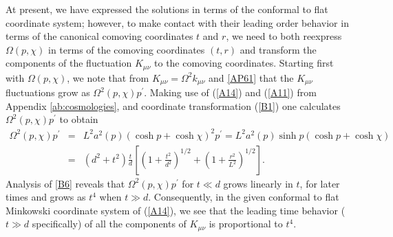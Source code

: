At present, we have expressed the solutions in terms of the conformal to flat coordinate system; however, to make contact with their leading order behavior in terms of the canonical comoving coordinates $t$ and $r$, we need to both reexpress $\Omega(p,\chi)$ in terms of the comoving coordinates $(t,r)$ and transform the components of the fluctuation $K_{\mu\nu}$ to the comoving coordinates. Starting first with $\Omega(p,\chi)$, we note that from $K_{\mu\nu} = \Omega^2 k_{\mu\nu}$ and \eqref{AP61} that the $K_{\mu\nu}$ fluctuations grow as $\Omega^2(p,\chi)p^{\prime}$. Making use of (\ref{A14}) and (\ref{A11}) from Appendix \ref{ab:cosmologies}, and coordinate transformation (\ref{B1}) one calculates $\Omega^2(p,\chi)p^{\prime}$ to obtain
%
\begin{eqnarray}
\Omega^2(p,\chi)p^{\prime}&=&L^2a^2(p)(\cosh p+\cosh \chi)^2p^{\prime}=L^2a^2(p)\sinh p (\cosh p+\cosh \chi)
\nonumber\\
&=&(d^2+t^2)\frac{t}{d}\left[\left(1+\frac{t^2}{d^2}\right)^{1/2}+\left(1+\frac{r^2}{L^2}\right)^{1/2}\right].
\label{B6}
\end{eqnarray}
%
Analysis of \eqref{B6} reveals that $\Omega^2(p,\chi)p^{\prime}$ for $t\ll d$ grows linearly in $t$, for later times and grows as $t^4$ when $t\gg d$. Consequently, in the given conformal to flat Minkowski coordinate system of (\ref{A14}), we see that the leading time behavior ($t \gg d$ specifically) of all the components of $K_{\mu\nu}$ is proportional to $t^4$.

